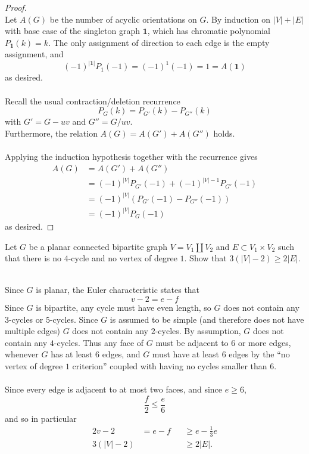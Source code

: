 \documentclass{article}
\newenvironment{problem}[2][Problem]{\begin{trivlist}
\item[\hskip \labelsep {\bfseries #1}\hskip \labelsep {\bfseries #2.}]}{\end{trivlist}}
\newenvironment{solution}[1][Solution.]{\begin{trivlist}
\item[\hskip \labelsep {\bfseries #1}]}{\end{trivlist}}
\begin{document}
\begin{proof} \text{} \\
  Let $A(G)$ be the number of acyclic orientations on $G$.
  By induction on $|V| + |E|$ with base case of the singleton graph $\mathbf 1$, which has
  chromatic polynomial $P_{\mathbf 1}(k) = k$.
  The only assignment of direction to each edge is the empty assignment, and
  \[
    (-1)^{|\mathbf 1|}P_1(-1) = (-1)^1(-1) = 1 = A(\mathbf 1)
  \] as desired.
  \\~\\
  Recall the usual contraction/deletion recurrence \[
    P_{G}(k) = P_{G'}(k) - P_{G''}(k)
  \] with $G' = G - uv$ and $G'' = G/uv$.
  \\
  Furthermore, the relation $A(G) = A(G') + A(G'')$ holds.
  \\~\\
  Applying the induction hypothesis together with the recurrence gives
  \begin{align*}
    A(G) &= A(G') + A(G'')\\
    &= (-1)^{|V|}P_{G'}(-1) + (-1)^{|V|-1}P_{G'}(-1) \\
    &=(-1)^{|V|}(P_{G'}(-1) - P_{G''}(-1)) \\
    &= (-1)^{|V|}P_G(-1)
  \end{align*} as desired.
\end{proof}
\pagebreak
\begin{problem}{4}
  Let $G$ be a planar connected bipartite graph $V = V_1 \coprod V_2$ and
  $E \subset V_1 \times V_2$ such that there is no $4$-cycle and no vertex of
  degree $1$. Show that $3(|V|-2) \geq 2|E|$.
\end{problem}

\begin{solution} \text{} \\
  Since $G$ is planar, the Euler characteristic states that \[
    v - 2 = e - f
  \]
  Since $G$ is bipartite, any cycle must have even length, so $G$ does not
  contain any $3$-cycles or $5$-cycles. Since $G$ is
  assumed to be simple (and therefore does not have multiple edges) $G$ does
  not contain any $2$-cycles. By assumption, $G$ does not contain any $4$-cycles.
  Thus any face of $G$ must be adjacent to $6$ or more edges, whenever $G$ has
  at least $6$ edges, and $G$ must have at least $6$ edges by the ``no vertex of
  degree $1$ criterion'' coupled with having no cycles smaller than $6$.
  \\~\\
  Since every edge is adjacent to at most two faces, and since $e \geq 6$, \[
    \frac f2 \leq \frac e6
  \] and so in particular \begin{alignat*}{2}
    v - 2 &= e - f &&\geq e - \frac 13e \\
    3(|V| - 2)& &&\geq 2|E|.
  \end{alignat*}
\end{solution}
\end{document}
